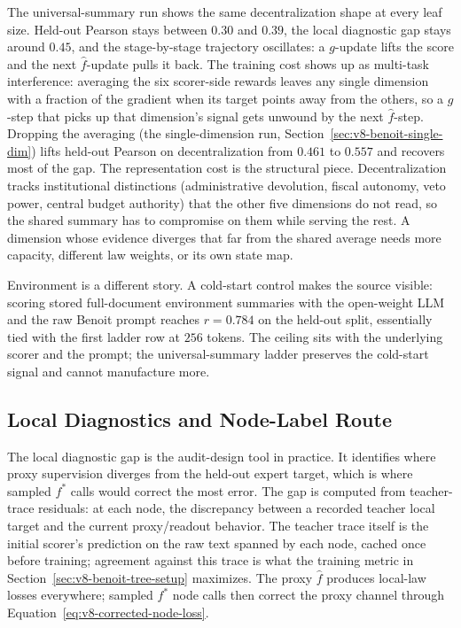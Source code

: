 The universal-summary run shows the same decentralization shape at
every leaf size. Held-out Pearson stays between \(0.30\) and
\(0.39\), the local diagnostic gap stays around \(0.45\), and the
stage-by-stage trajectory oscillates: a \(g\)-update lifts the
score and the next \(\widehat f\)-update pulls it back. The
training cost shows up as multi-task interference: averaging the
six scorer-side rewards leaves any single dimension with a fraction
of the gradient when its target points away from the others, so a
\(g\)-step that picks up that dimension's signal gets unwound by
the next \(\widehat f\)-step. Dropping the averaging (the
single-dimension run, Section~\ref{sec:v8-benoit-single-dim}) lifts
held-out Pearson on decentralization from \(0.461\) to \(0.557\)
and recovers most of the gap. The representation cost is the
structural piece. Decentralization tracks institutional
distinctions (administrative devolution, fiscal autonomy, veto
power, central budget authority) that the other five dimensions do
not read, so the shared summary has to compromise on them while
serving the rest. A dimension whose evidence diverges that far from
the shared average needs more capacity, different law weights, or
its own state map.

Environment is a different story. A cold-start control makes the
source visible: scoring stored full-document environment summaries
with the open-weight LLM and the raw Benoit prompt reaches
\(r=0.784\) on the held-out split, essentially tied with the first
ladder row at \(256\) tokens. The ceiling sits with the underlying
scorer and the prompt; the universal-summary ladder preserves the
cold-start signal and cannot manufacture more.

\subsection{Local Diagnostics and Node-Label Route}
\label{sec:v8-benoit-local-diagnostics}

The local diagnostic gap is the audit-design tool in practice. It
identifies where proxy supervision diverges from the held-out
expert target, which is where sampled \(f^\ast\) calls would
correct the most error. The gap is computed from teacher-trace
residuals: at each node, the discrepancy between a recorded teacher
local target and the current proxy/readout behavior. The teacher
trace itself is the initial scorer's prediction on the raw text
spanned by each node, cached once before training; agreement
against this trace is what the training metric in
Section~\ref{sec:v8-benoit-tree-setup} maximizes. The proxy
\(\widehat f\) produces local-law losses everywhere; sampled
\(f^\ast\) node calls then correct the proxy channel through
Equation~\eqref{eq:v8-corrected-node-loss}.

